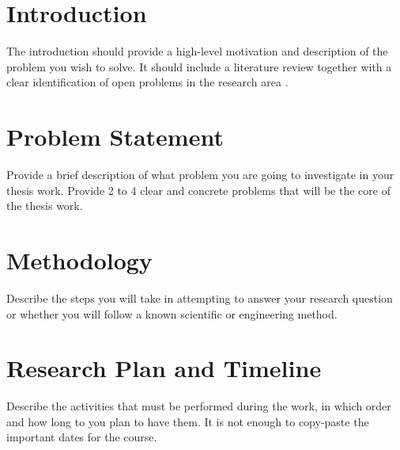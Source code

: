 \documentclass[times, 11pt]{AeroResearchProposal}
\begin{document}
\titlePage

\mainmatter
\noindent{}

\section*{Introduction}

\alert{The introduction should provide a high-level motivation and description of the problem you wish to solve.  It should include a literature review together with a clear identification of open problems in the research area} \cite{Berndtsson607210}.


\section*{Problem Statement}

\alert{Provide a brief description of what problem you are going to investigate in your thesis work. Provide 2 to 4 clear and concrete problems that will be the core of the thesis work.}


\section*{Methodology}
\alert{Describe the steps you will take in attempting to answer your research question or whether you will follow a known scientific or engineering method.}


\section*{Research Plan and Timeline}
\alert{Describe the activities that must be performed during the work, in which order and how long to you plan to have them. It is not enough to copy-paste the important dates for the course.}




\bigskip
{}
\end{document}
